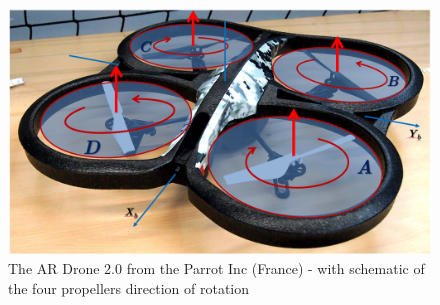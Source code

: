 \begin{figure}
\includegraphics[width=0.5\linewidth]{Figures/TheDrone.png}
\centering
\caption{The AR Drone 2.0 from the Parrot Inc (France) - with schematic of the four propellers direction of rotation}
\label{f:TheDrone}
\end{figure}




